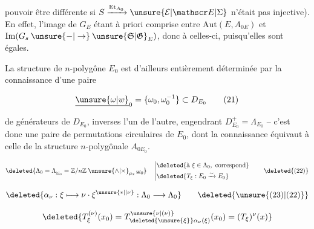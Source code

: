 
pouvoir être différente si $S\xrightarrow{\mathrm{Et}_{A_0}}\unsure{\mathcal E|\mathscr E|\Sigma}$ n'était pas injective). En effet, l'image de $G_E$ étant à priori comprise entre $\mathrm{Aut}(E,A_{0E})$ et $\mathrm{Im}(G_s\mathbin{\unsure{-|\to}}\unsure{\mathfrak S|\mathfrak G}_E)$, donc  à celles-ci, puisqu'elles sont égales.

La structure de $n$-polygône  $E_0$ est
d'ailleurs entièrement déterminée par la
connaissance d'une paire

\[
 \underline{\unsure{\omega|w}}_0=\{\omega_0,\omega_0^{-1}\}\subset D_{E_0} \tag*{(21)}
\]

de générateurs de $D_{E_0}$,  inverses l'un
de l'autre, engendrant $D_{E_0}^+=\Lambda_{E_0}$ -- c'est donc
une paire de permutations circulaires de
$E_0$, dont la connaissance équivaut à celle de
la structure $n$-polygônale $A_{0E_0}$.

\quad {} 

\[
 \deleted{\Lambda_0=\Lambda_{\underline\omega_0}=\mathbb Z/n\mathbb Z\mathbin{\unsure{\wedge|\times}}_{\mu_2}\underline\omega_0}\quad
 \left|\begin{aligned}
 &\deleted{\text{à }\xi\in\Lambda_0,\text{ correspond}}\\
 &\deleted{T_\xi:E_0\xrightarrow{\sim}E_0}
 \end{aligned}\right. \tag*{\deleted{(22)}}
\]

 

\[
 \deleted{\alpha_\nu:\xi\longmapsto\nu\cdot\xi^{\unsure{*|\vphantom{1}|\nu}}:\Lambda_0\longrightarrow\Lambda_0} \tag*{\deleted{\unsure{(23)|(22)}}}
\]


\[
 \deleted{T^{(\nu)}_{\xi}(x_0)=T^{\unsure{\nu|(\nu)}}_{\deleted{\unsure{\xi}}\alpha_\nu(\xi)}(x_0)=(T_\xi)^\nu(x)}
\]

